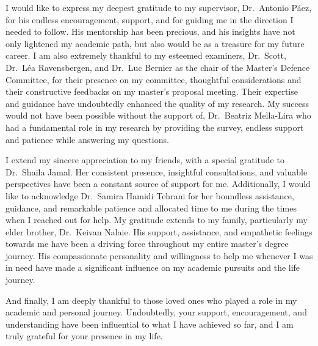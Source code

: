 \documentclass[
11pt, %
oneside, %
english, %
singlespacing, %
]{macthesis} %
\begin{document}
  I would like to express my deepest gratitude to my supervisor, Dr.~Antonio Páez, for his endless encouragement, support, and for guiding me in the direction I needed to follow. His mentorship has been precious, and his insights have not only lightened my academic path, but also would be as a treasure for my future career. I am also extremely thankful to my esteemed examiners, Dr.~Scott, Dr.~Léa Ravensbergen, and Dr.~Luc Bernier as the chair of the Master's Defence Committee, for their presence on my committee, thoughtful considerations and their constructive feedbacks on my master's proposal meeting. Their expertise and guidance have undoubtedly enhanced the quality of my research. My success would not have been possible without the support of, Dr.~Beatriz Mella-Lira who had a fundamental role in my research by providing the survey, endless support and patience while answering my questions.

  I extend my sincere appreciation to my friends, with a special gratitude to Dr.~Shaila Jamal. Her consistent presence, insightful consultations, and valuable perspectives have been a constant source of support for me. Additionally, I would like to acknowledge Dr.~Samira Hamidi Tehrani for her boundless assistance, guidance, and remarkable patience and allocated time to me during the times when I reached out for help. My gratitude extends to my family, particularly my elder brother, Dr.~Keivan Nalaie. His support, assistance, and empathetic feelings towards me have been a driving force throughout my entire master's degree journey. His compassionate personality and willingness to help me whenever I was in need have made a significant influence on my academic pursuits and the life journey.

  And finally, I am deeply thankful to those loved ones who played a role in my academic and personal journey. Undoubtedly, your support, encouragement, and understanding have been influential to what I have achieved so far, and I am truly grateful for your presence in my life.
\clearpage

\end{document}
